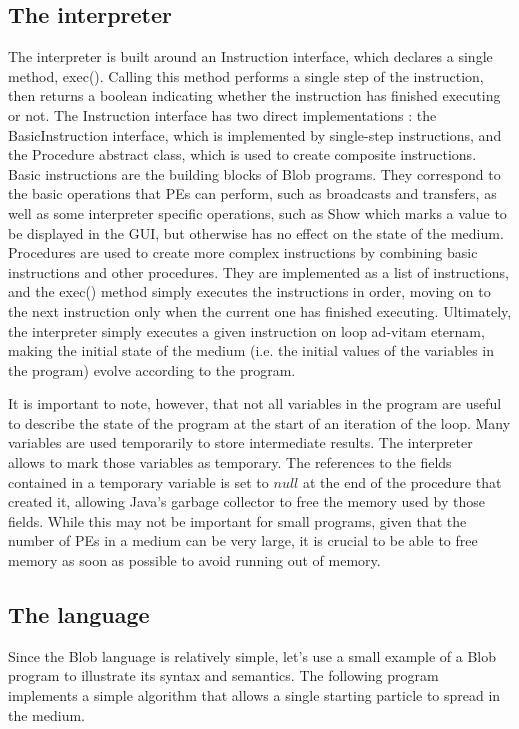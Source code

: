 \documentclass[11pt,a4paper]{report}
\begin{document}
\subsection{The interpreter}

The interpreter is built around an Instruction interface, which declares a single method, exec(). Calling this method performs a single step of the instruction, then returns a boolean indicating whether the instruction has finished executing or not. The Instruction interface has two direct implementations : the BasicInstruction interface, which is implemented by single-step instructions, and the Procedure abstract class, which is used to create composite instructions. Basic instructions are the building blocks of Blob programs. They correspond to the basic operations that PEs can perform, such as broadcasts and transfers, as well as some interpreter specific operations, such as Show which marks a value to be displayed in the GUI, but otherwise has no effect on the state of the medium. Procedures are used to create more complex instructions by combining basic instructions and other procedures. They are implemented as a list of instructions, and the exec() method simply executes the instructions in order, moving on to the next instruction only when the current one has finished executing. Ultimately, the interpreter simply executes a given instruction on loop ad-vitam eternam, making the initial state of the medium (i.e. the initial values of the variables in the program) evolve according to the program. 

It is important to note, however, that not all variables in the program are useful to describe the state of the program at the start of an iteration of the loop. Many variables are used temporarily to store intermediate results. The interpreter allows to mark those variables as temporary. The references to the fields contained in a temporary variable is set to $null$ at the end of the procedure that created it, allowing Java's garbage collector to free the memory used by those fields. While this may not be important for small programs, given that the number of PEs in a medium can be very large, it is crucial to be able to free memory as soon as possible to avoid running out of memory.

\subsection{The language}

Since the Blob language is relatively simple, let's use a small example of a Blob program to illustrate its syntax and semantics. The following program implements a simple algorithm that allows a single starting particle to spread in the medium.
\end{document}

